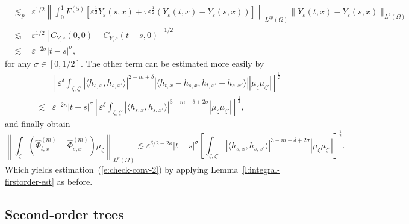 \documentclass[a4paper,11pt]{article}
\begin{document}
\begin{eqnarray*}
  & \lesssim_p & \varepsilon^{1 / 2} \left\| \int_0^1 F^{(5)}
  [\varepsilon^{\frac{1}{2}} Y_{\varepsilon} (s, x) + \tau
  \varepsilon^{\frac{1}{2}} (Y_{\varepsilon} (t, x) - Y_{\varepsilon} (s, x))]
  \right\|_{L^{2 p} (\Omega)}  \| Y_{\varepsilon} (t, x) - Y_{\varepsilon} (s,
  x) \|_{L^2 (\Omega)}\\
  & \lesssim & \varepsilon^{1 / 2} [C_{Y, \varepsilon} (0, 0) - C_{Y,
  \varepsilon} (t - s, 0)]^{1 / 2} \\
  & \lesssim & \varepsilon^{- 2 \sigma} | t - s |^{\sigma},
\end{eqnarray*}
for any $\sigma \in [0, 1 / 2]$. The other term can be estimated more easily
by
\begin{eqnarray*}
  &  & \left[ \varepsilon^{\delta} \int_{\zeta, \zeta'} | \langle h_{s, x},
  h_{s, x'} \rangle |^{2 - m + \delta} | \langle h_{t, x} - h_{s, x}, h_{t,
  x'} - h_{s, x'} \rangle | | \mu_{\zeta} \mu_{\zeta'} |
  \right]^{\frac{1}{2}}\\
  & \lesssim & \varepsilon^{- 2 \kappa} | t - s |^{\sigma} \left[
  \varepsilon^{\delta} \int_{\zeta, \zeta'} | \langle h_{s, x}, h_{s, x'}
  \rangle |^{3 - m + \delta + 2 \sigma} | \mu_{\zeta} \mu_{\zeta'} |
  \right]^{\frac{1}{2}},
\end{eqnarray*}
and finally obtain
\[ \left\| \int_{\zeta} (\hat{\Phi}^{(m)}_{t, x} - \hat{\Phi}^{(m)}_{s, x})
   \mu_{\zeta} \right\|_{L^p (\Omega)} \lesssim \varepsilon^{\delta / 2 - 2
   \kappa} | t - s |^{\sigma} \left[ \int_{\zeta, \zeta'} | \langle h_{s, x},
   h_{s, x'} \rangle |^{3 - m + \delta + 2 \sigma} | \mu_{\zeta} \mu_{\zeta'}
   | \right]^{\frac{1}{2}} . \]
Which yields estimation~(\ref{e:check-conv-2}) by applying
Lemma~\ref{l:integral-firstorder-est} as before.

\subsection{Second-order trees}
\end{document}
